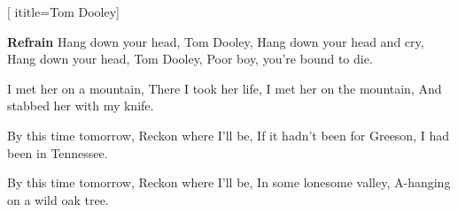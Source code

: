  [
ititle={Tom Dooley}]

\beginchorus
\textbf{Refrain}
Hang down your head, Tom Dooley,
Hang down your head and cry,
Hang down your head, Tom Dooley,
Poor boy, you're bound to die.
\endchorus

\beginverse
I met her on a mountain,
There I took her life,
I met her on the mountain,
And stabbed her with my knife.
\endverse

\beginverse
By this time tomorrow,
Reckon where I'll be,
If it hadn't been for Greeson,
I had been in Tennessee.
\endverse

\beginverse
By this time tomorrow,
Reckon where I'll be,
In some lonesome valley,
A-hanging on a wild oak tree.
\endverse
\endsong